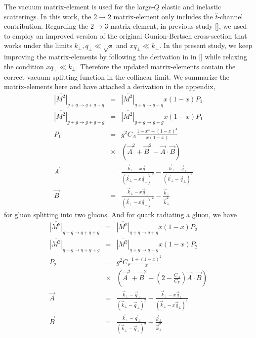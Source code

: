 \documentclass[aps, prc, reprint, amsmath, groupedaddress, nofootinbib]{revtex4-1}
\begin{document}
The vacuum matrix-element is used for the large-$Q$ elastic and inelastic scatterings.
In this work, the $2\rightarrow 2$ matrix-element only includes the $\hat{t}$-channel contribution.
Regarding the $2\rightarrow 3$ matrix-element, in previous study [], we used to employ an improved version of the original Gunion-Bertsch cross-section that works under the limits $k_\perp, q_\perp \ll \sqrt{s}$ and $x q_\perp \ll k_\perp$.
In the present study, we keep improving the matrix-elements by following the derivation in in [] while relaxing the condition $x q_\perp \ll k_\perp$.
Therefore the updated matrix-elements contain the correct vacuum splitting function in the collinear limit.
We summarize the matrix-elements here and have attached a derivation in the appendix,
\begin{eqnarray}
\overline{|M^2|}_{g+q\rightarrow g+g+q} &=& \overline{|M^2|}_{g+q\rightarrow g+q} x(1-x) P_1\\
\overline{|M^2|}_{g+g\rightarrow g+g+g} &=& \overline{|M^2|}_{g+g\rightarrow g+g} x(1-x) P_1\\
P_1 &=& g^2  C_A\frac{1+x^4+(1-x)^4}{x(1-x)}   \\\nonumber
&\times&\left(\vec{A}^2 + \vec{B}^2 - \vec{A}\cdot\vec{B}\right)\\
\vec{A} &=& \frac{\vec{k}_\perp - x\vec{q}_\perp}{(\vec{k}_\perp - x\vec{q}_\perp)^2} -  \frac{\vec{k}_\perp - \vec{q}_\perp}{(\vec{k}_\perp - \vec{q}_\perp)^2} \\
\vec{B} &=& \frac{\vec{k}_\perp - x\vec{q}_\perp}{(\vec{k}_\perp - x\vec{q}_\perp)^2} -  \frac{\vec{k}_\perp}{\vec{k}_\perp^2}
\end{eqnarray}
for gluon splitting into two gluons. And for quark radiating a gluon, we have
\begin{eqnarray}
\overline{|M^2|}_{q+q\rightarrow q+q+g} &=& \overline{|M^2|}_{q+q\rightarrow q+q} x(1-x) P_2\\
\overline{|M^2|}_{q+g\rightarrow q+g+g} &=& \overline{|M^2|}_{q+g\rightarrow q+g} x(1-x) P_2\\
P_2 &=& g^2 C_F\frac{1+(1-x)^2}{x}  \\\nonumber
&\times&\left(\vec{A}^2 + \vec{B}^2 - \left(2-\frac{C_A}{C_F}\right)\vec{A}\cdot\vec{B}\right)\\
\vec{A} &=& \frac{\vec{k}_\perp - \vec{q}_\perp}{(\vec{k}_\perp - \vec{q}_\perp)^2} -  \frac{\vec{k}_\perp - x\vec{q}_\perp}{(\vec{k}_\perp - x\vec{q}_\perp)^2} \\
\vec{B} &=& \frac{\vec{k}_\perp - \vec{q}_\perp}{(\vec{k}_\perp - \vec{q}_\perp)^2} -  \frac{\vec{k}_\perp}{\vec{k}_\perp^2}
\end{eqnarray}
\end{document}
